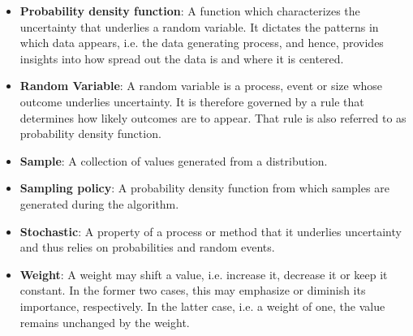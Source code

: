 \begin{itemize}
    \item \textbf{Probability density function}: A function which characterizes the
    uncertainty that underlies a random variable. It dictates the 
    patterns in which data appears, i.e. the data generating process, 
    and hence, provides insights into how spread out the data is 
    and where it is centered. 
            
    \item \textbf{Random Variable}: A random variable is a process, event or size whose 
    outcome underlies uncertainty. It is therefore governed by a rule that 
    determines how likely outcomes are to appear. That rule is also 
    referred to as probability density function.
    
    \item \textbf{Sample}: A collection of values generated from a distribution. 
    
    \item \textbf{Sampling policy}: A probability density function from which samples 
    are generated during the algorithm. 
    
    \item \textbf{Stochastic}: A property of a process or method that 
    it underlies uncertainty and thus relies on 
    probabilities and random events.
    
    \item \textbf{Weight}: A weight may shift a value, i.e. increase it, decrease it or keep it constant. 
    In the former two cases, this may emphasize or diminish its importance, respectively. 
    In the latter case, i.e. a weight of one, the value remains unchanged by the weight.
    
\end{itemize}
